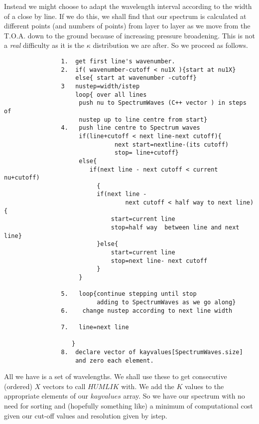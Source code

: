 \documentclass[12pt]{article}
\begin{document}
 Instead we might choose to adapt the wavelength interval according to
the width of a close by line. If we do this, we shall find that our spectrum is calculated at different
points (and numbers of points) from layer to layer as we move from the T.O.A. down to the ground 
because of increasing pressure broadening. This is not a {\it real} difficulty as it is the $\kappa$
distribution we are after. So we proceed as follows.
\begin{verbatim}
                1.  get first line's wavenumber.
                2.  if( wavenumber-cutoff < nu1X ){start at nu1X}
                    else{ start at wavenumber -cutoff}
                3   nustep=width/istep
                    loop{ over all lines     
                     push nu to SpectrumWaves (C++ vector ) in steps of
                     nustep up to line centre from start}
                4.   push line centre to Spectrum waves
                     if(line+cutoff < next line-next cutoff){
                               next start=nextline-(its cutoff) 
                               stop= line+cutoff}
                     else{
                        if(next line - next cutoff < current nu+cutoff)
                          {
                          if(next line - 
                                  next cutoff < half way to next line){
                              start=current line
                              stop=half way  between line and next line}
                          }else{
                              start=current line
                              stop=next line- next cutoff
                          }
                     } 

                5.   loop{continue stepping until stop
                          adding to SpectrumWaves as we go along}
                6.    change nustep according to next line width
   
                7.   line=next line
 
                   }
                8.  declare vector of kayvalues[SpectrumWaves.size] 
                    and zero each element.
\end{verbatim} 
All we have is a set of wavelengths. We shall use these to get consecutive (ordered) $X$ vectors to call
$HUMLIK$ with. We add the $K$ values to the appropriate elements of our $kayvalues$ array.
So we have our spectrum with no need for sorting and (hopefully something like) a minimum of computational
cost given our cut-off values and resolution given by istep. 
\end{document}
